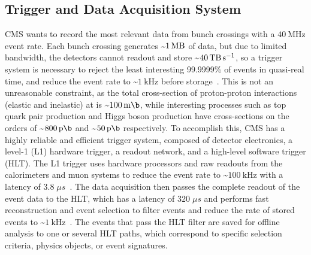 \subsection{Trigger and Data Acquisition System}
CMS wants to record the most relevant data from bunch crossings with a $\SI{40}{\mega \Hz}$ event rate.
Each bunch crossing generates \sim$\SI{1}{\mega \byte}$ of data, but due to limited bandwidth, the detectors cannot readout and store \sim$\SI{40}{\tera \byte \per \s}$, so a trigger system is necessary to reject the least interesting 99.9999\% of events in quasi-real time, and reduce the event rate to \sim$\SI{1}{\kilo \Hz}$ before storage~\cite{Chatrchyan:1129810}.
This is not an unreasonable constraint, as the total cross-section of proton-proton interactions (elastic and inelastic) at \beamenergy is \sim$\SI{100}{\milli \b}$, while interesting processes such as top quark pair production and Higgs boson production have cross-sections on the orders of \sim$\SI{800}{\pico \b}$ and \sim$\SI{50}{\pico \b}$ respectively.
To accomplish this, CMS has a highly reliable and efficient trigger system, composed of detector electronics, a level-1 (L1) hardware trigger, a readout network, and a high-level software trigger (HLT).
The L1 trigger uses hardware processors and raw readouts from the calorimeters and muon systems to reduce the event rate to \sim$\SI{100}{\kHz}$ with a latency of $3.8 \; \mu s$~\cite{Chatrchyan:1129810}.
The data acquisition then passes the complete readout of the event data to the HLT, which has a latency of $320 \; \mu s$ and performs fast reconstruction and event selection to filter events and reduce the rate of stored events to \sim$\SI{1}{\kilo \Hz}$~\cite{Chatrchyan:1129810}.
The events that pass the HLT filter are saved for offline analysis to one or several HLT paths, which correspond to specific selection criteria, physics objects, or event signatures.



